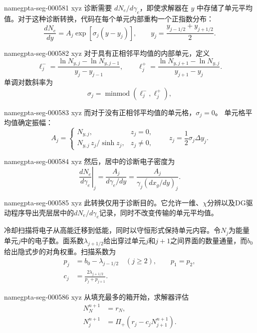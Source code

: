 \documentclass[twocolumn]{aastex702}
\makeatletter
\providecommand{\gptareaderanchor}[1]{\pdfdest name{#1} xyz}%
\providecommand{\gptareaderanchor}[1]{\special{pdf:dest (#1) [ @thispage /XYZ @xpos @ypos null ]}}%
\makeatother
\begin{document}
\gptareaderanchor{gpta-seg-000581}%
诊断需要 \(dN_e/d\gamma_e\)，即使求解器在 \(y\) 中存储了单元平均值。对于这种诊断转换，代码在每个单元内部重构一个正指数分布：
\begin{equation}
\frac{dN_e}{dy}=A_j\exp[\sigma_j(y-y_j)],
\qquad
y_j=\frac{y_{j-1/2}+y_{j+1/2}}{2}.
\end{equation}

\gptareaderanchor{gpta-seg-000582}%
对于具有正相邻平均值的内部单元，定义
\begin{equation}
\ell_j^-=\frac{\ln N_{y,j}-\ln N_{y,j-1}}{y_j-y_{j-1}},
\qquad
\ell_j^+=\frac{\ln N_{y,j+1}-\ln N_{y,j}}{y_{j+1}-y_j}.
\end{equation}
单调对数斜率为
\begin{equation}
\sigma_j=\operatorname{minmod}(\ell_j^-,\ell_j^+),
\end{equation}

\gptareaderanchor{gpta-seg-000583}%
而对于没有正相邻平均值的单元格，\(\sigma_j=0\)。
单元格平均值确定振幅：
\begin{equation}
A_j=
\begin{cases}
N_{y,j}, & z_j=0,\\
N_{y,j}\,z_j/\sinh z_j, & z_j\ne0,
\end{cases}
\qquad
z_j=\frac{1}{2}\sigma_j\Delta y_j .
\end{equation}

\gptareaderanchor{gpta-seg-000584}%
然后，居中的诊断电子密度为
\begin{equation}
\left.\frac{dN_e}{d\gamma_e}\right|_j
=
\frac{A_j}{d\gamma_e/dy}
=
\frac{A_j}{\gamma_j(dx_g/dy)_j}.
\end{equation}

\gptareaderanchor{gpta-seg-000585}%
此转换仅用于诊断目的。它允许一维、\(\chi\)分辨以及DG驱动程序导出壳层居中的\(dN_e/d\gamma_e\)记录，同时不改变传输的单元平均值。

冷却扫描将电子从高能迁移到低能，同时以守恒形式保持单元内容。令\(N_j\)为能量单元\(j\)中的电子数。面系数\(\lambda_{j+1/2}\)给出穿过单元\(j\)和\(j+1\)之间界面的数量通量，而\(b_0\)给出隐式步的对角权重。扫描系数为
\begin{equation}
\begin{aligned}
p_j&=b_0-\lambda_{j-1/2}\quad (j\ge2),\qquad p_1=p_2,\\
c_j&=\frac{2\lambda_{j+1/2}}{p_j+p_{j+1}} .
\end{aligned}
\end{equation}

\gptareaderanchor{gpta-seg-000586}%
从填充最多的箱开始，求解器评估
\begin{equation}
\begin{aligned}
N_N^{n+1}&=r_N,\\
N_j^{n+1}&=\Pi_+\!\left(r_j-c_jN_{j+1}^{n+1}\right).
\end{aligned}
\label{eq:triangular-cooling-sweep}
\end{equation}
\end{document}
